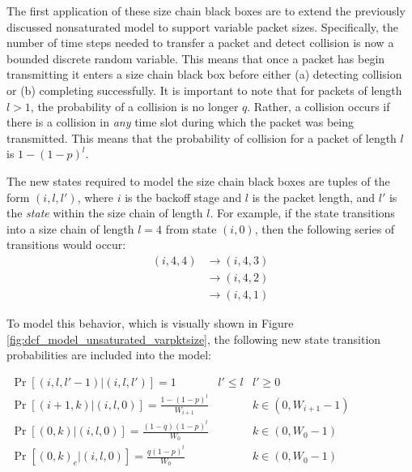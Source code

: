 \documentclass{llncs}
\begin{document}
The first application of these size chain black boxes are to extend the previously discussed nonsaturated model to support variable packet sizes. Specifically, the number of time steps needed to transfer a packet and detect collision is now a bounded discrete random variable. This means that once a packet has begin transmitting it enters a size chain black box before either (a) detecting collision or (b) completing successfully. It is important to note that for packets of length $l > 1$, the probability of a collision is no longer $q$. Rather, a collision occurs if there is a collision in \emph{any} time slot during which the packet was being transmitted. This means that the probability of collision for a packet of length $l$ is $1 - (1 - p)^l$. 

The new states required to model the size chain black boxes are tuples of the form $(i, l, l')$, where $i$ is the backoff stage and $l$ is the packet length, and $l'$ is the \emph{state} within the size chain of length $l$. For example, if the state transitions into a size chain of length $l = 4$ from state $(i, 0)$, then the following series of transitions would occur: 
\begin{align*}
(i, 4, 4) & \to (i, 4, 3) \\
& \to (i, 4, 2) \\
& \to (i, 4, 1)
\end{align*}

To model this behavior, which is visually shown in Figure \ref{fig:dcf_model_unsaturated_varpktsize}, the following new state transition probabilities are included into the model:

\begin{center}
\begin{math}
\boxed{
\begin{array}{lll}
\Pr[(i,l,l'-1) | (i,l,l')] = 1 & l' \leq l & l' \geq 0 \\
\Pr[(i+1,k) | (i,l,0)] = \frac{1 - (1 - p)^l}{W_{i+1}} & ~ & k \in (0, W_{i+1} - 1) \\
\Pr[(0,k) | (i,l,0)] = \frac{(1 - q)(1 - p)^l}{W_0} & ~ & k \in (0, W_{0} - 1) \\
\Pr[(0,k)_e | (i,l,0)] = \frac{q(1 - p)^l}{W_0} & ~ & k \in (0, W_{0} - 1) \\
\end{array}
}
\end{math}
\end{center}
\end{document}
